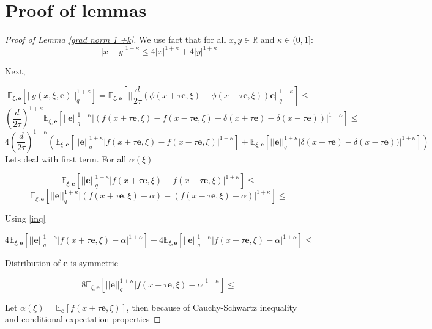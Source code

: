 \documentclass{article}
\newcommand{\RR}{\mathcal{R}}
\theoremstyle{definition}
\theoremstyle{remark}
\def\RR{\mathbb{R}}
\def\EE{\mathbb{E}}
\begin{document}
\section{Proof of lemmas}
\begin{proof}[Proof of Lemma \ref{grad norm 1 +k}]
We use fact that for all $x,y \in \RR$ and $\kappa \in (0,1]$: \begin{equation}\label{inq}
    |x-y|^{1+\kappa} \leq 4|x|^{1+\kappa} + 4|y|^{1+ \kappa}
\end{equation}

Next, 

$$\EE_{\xi, \mathbf{e}}[||g(x,\xi,\mathbf{e})||_q^{1+\kappa}] = \EE_{\xi, \mathbf{e}}\left[||\frac{d}{2\tau}(\phi(x + \tau \mathbf{e}, \xi) - \phi(x - \tau \mathbf{e}, \xi)) \mathbf{e}||_q^{1+\kappa}\right] \leq $$
$$\left(\frac{d}{2\tau} \right)^{1+\kappa}\EE_{\xi, \mathbf{e}}\left[||\mathbf{e}||_q^{1+\kappa}|(f(x + \tau \mathbf{e}, \xi) - f(x - \tau \mathbf{e}, \xi) + \delta(x + \tau \mathbf{e}) - \delta(x - \tau \mathbf{e})) |^{1+\kappa}\right]\leq$$
$$4\left(\frac{d}{2\tau} \right)^{1+\kappa}\left(\EE_{\xi, \mathbf{e}}\left[||\mathbf{e}||_q^{1+\kappa}|f(x + \tau \mathbf{e}, \xi) - f(x - \tau \mathbf{e}, \xi)|^{1+\kappa}\right] + \EE_{\xi, \mathbf{e}}\left[||\mathbf{e}||_q^{1+\kappa}|\delta(x + \tau \mathbf{e}) - \delta(x - \tau \mathbf{e})) |^{1+\kappa}\right]\right)$$
Lets deal with first term. For all $\alpha(\xi)$ 

$$\EE_{\xi, \mathbf{e}}\left[||\mathbf{e}||_q^{1+\kappa}|f(x + \tau \mathbf{e}, \xi) - f(x - \tau \mathbf{e}, \xi)|^{1+\kappa}\right] \leq$$
$$\EE_{\xi, \mathbf{e}}\left[||\mathbf{e}||_q^{1+\kappa}|(f(x + \tau \mathbf{e}, \xi) - \alpha) - (f(x - \tau \mathbf{e}, \xi) - \alpha)|^{1+\kappa}\right] \leq$$

Using \ref{inq}

$$4\EE_{\xi, \mathbf{e}}\left[||\mathbf{e}||_q^{1+\kappa}|f(x + \tau \mathbf{e}, \xi) - \alpha|^{ 1+\kappa} \right] + 4\EE_{\xi, \mathbf{e}}\left[||\mathbf{e}||_q^{1+\kappa}|f(x - \tau \mathbf{e}, \xi) - \alpha|^{ 1+\kappa} \right] \leq $$

Distribution of $\mathbf{e}$ is symmetric

$$8\EE_{\xi, \mathbf{e}}\left[||\mathbf{e}||_q^{1+\kappa}|f(x + \tau \mathbf{e}, \xi) - \alpha|^{ 1+\kappa} \right]  \leq $$

Let $\alpha(\xi)  = \EE_\mathbf{e}[f(x + \tau\mathbf{e}, \xi)]$, then because of Cauchy-Schwartz inequality and conditional expectation properties


\end{proof}
\end{document}
